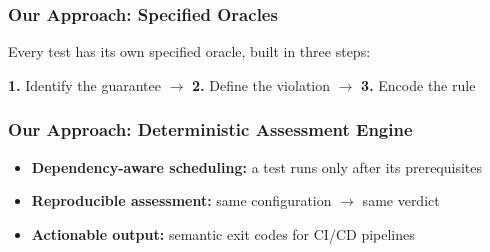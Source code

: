 \begin{frame}
    \frametitle{Our Approach: Specified Oracles}

    Every test has its own \alert{specified oracle}, built in three steps:

    \vspace{.6em}
    \begin{center}
        \textbf{1.} Identify the guarantee
        \quad$\rightarrow$\quad
        \textbf{2.} Define the \alert{violation}
        \quad$\rightarrow$\quad
        \textbf{3.} Encode the rule
    \end{center}

    \vspace{.8em}
\end{frame}

\begin{frame}
    \frametitle{Our Approach: Deterministic Assessment Engine}

    \begin{itemize}
        \setlength{\itemsep}{0.8em}
        \item \textbf{Dependency-aware scheduling:} a test runs only after its \alert{prerequisites}

        \item \textbf{Reproducible assessment:} \alert{same configuration $\rightarrow$ same verdict}

        \item \textbf{Actionable output:} \alert{semantic exit codes} for CI/CD pipelines

    \end{itemize}
\end{frame}
